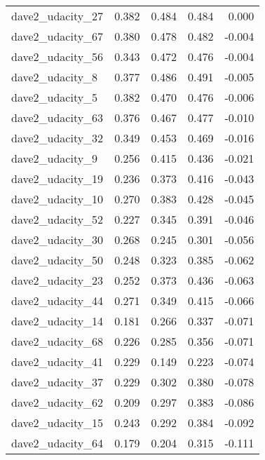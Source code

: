 \begin{tabular}{lrrrr}
dave2\_udacity\_27 &          0.382 &   0.484 &   0.484 &  0.000 \\
dave2\_udacity\_67 &          0.380 &   0.478 &   0.482 & -0.004 \\
dave2\_udacity\_56 &          0.343 &   0.472 &   0.476 & -0.004 \\
dave2\_udacity\_8  &          0.377 &   0.486 &   0.491 & -0.005 \\
dave2\_udacity\_5  &          0.382 &   0.470 &   0.476 & -0.006 \\
dave2\_udacity\_63 &          0.376 &   0.467 &   0.477 & -0.010 \\
dave2\_udacity\_32 &          0.349 &   0.453 &   0.469 & -0.016 \\
dave2\_udacity\_9  &          0.256 &   0.415 &   0.436 & -0.021 \\
dave2\_udacity\_19 &          0.236 &   0.373 &   0.416 & -0.043 \\
dave2\_udacity\_10 &          0.270 &   0.383 &   0.428 & -0.045 \\
dave2\_udacity\_52 &          0.227 &   0.345 &   0.391 & -0.046 \\
dave2\_udacity\_30 &          0.268 &   0.245 &   0.301 & -0.056 \\
dave2\_udacity\_50 &          0.248 &   0.323 &   0.385 & -0.062 \\
dave2\_udacity\_23 &          0.252 &   0.373 &   0.436 & -0.063 \\
dave2\_udacity\_44 &          0.271 &   0.349 &   0.415 & -0.066 \\
dave2\_udacity\_14 &          0.181 &   0.266 &   0.337 & -0.071 \\
dave2\_udacity\_68 &          0.226 &   0.285 &   0.356 & -0.071 \\
dave2\_udacity\_41 &          0.229 &   0.149 &   0.223 & -0.074 \\
dave2\_udacity\_37 &          0.229 &   0.302 &   0.380 & -0.078 \\
dave2\_udacity\_62 &          0.209 &   0.297 &   0.383 & -0.086 \\
dave2\_udacity\_15 &          0.243 &   0.292 &   0.384 & -0.092 \\
dave2\_udacity\_64 &          0.179 &   0.204 &   0.315 & -0.111 \\
\bottomrule
\end{tabular}
